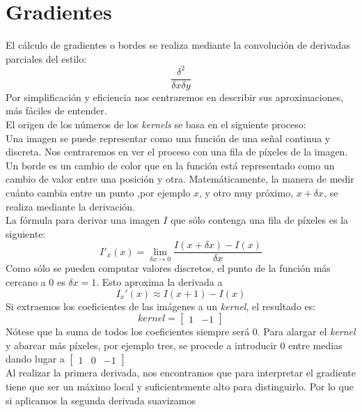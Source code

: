 \section{Gradientes}
El cálculo de gradientes o bordes se realiza mediante la convolución
de derivadas parciales del estilo:
\begin{equation*}
  \frac{\delta^{2}}{\delta x \delta y}
\end{equation*}
Por simplificación y eficiencia nos centraremos en describir sus
aproximaciones, más fáciles de entender. \\
El origen de los números de los \emph{kernels} se basa en el siguiente
proceso:\\
Una imagen se puede representar como una función de una señal continua
y discreta. Nos centraremos en ver el proceso con una fila de píxeles
de la imagen. Un borde es un cambio de color que en la función está
representado como un cambio de valor entre una posición y
otra. Matemáticamente, la manera de medir cuánto cambia entre un punto
,por ejemplo $x$, y otro muy próximo, $x + \delta x$, se realiza
mediante la
derivación.\\
La fórmula para derivar una imagen $I$ que sólo contenga una fila de
píxeles es la siguiente:
\begin{equation*}
  I'_x(x) = \lim_{\delta x \to 0}\frac{I(x+\delta x) - I(x)}{\delta x}
\end{equation*}
Como sólo se pueden computar valores discretos, el punto de la función
más cercano a $0$ es $\delta x = 1$. Esto aproxima la derivada a
\begin{equation*}
  I_x'(x) \approx I(x + 1) - I(x)
\end{equation*}
Si extraemos los coeficientes de las imágenes a un \emph{kernel}, el
resultado es:
\begin{equation*}
  kernel = \begin{bmatrix}
    1 & -1
  \end{bmatrix}
\end{equation*}
Nótese que la suma de todos los coeficientes siempre será $0$. Para
alargar el \emph{kernel} y abarcar más píxeles, por ejemplo tres, se
procede a introducir $0$ entre medias dando lugar a
$\begin{bmatrix} 1 & 0 & -1 \end{bmatrix}$ \\
Al realizar la primera derivada, nos encontramos que para interpretar
el gradiente tiene que ser un máximo local y suficientemente alto para
distinguirlo. Por lo que si aplicamos la segunda derivada suavizamos
